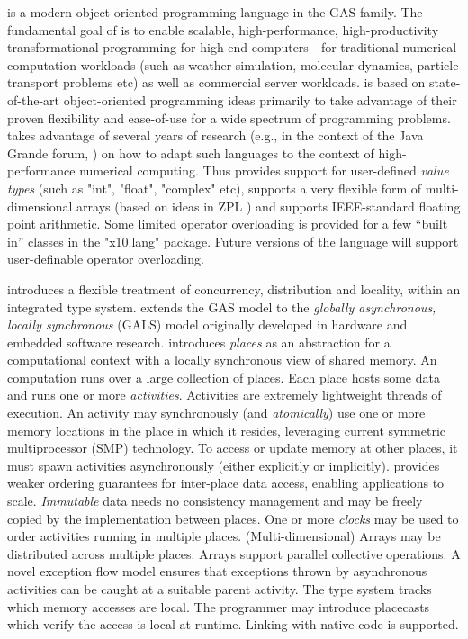 \Xten{} is a modern object-oriented programming language
in the GAS family. The fundamental goal of \Xten{} is to enable
scalable, high-performance, high-productivity transformational
programming for high-end computers---for traditional numerical
computation workloads (such as weather simulation, molecular dynamics,
particle transport problems etc) as well as commercial server
workloads.
\Xten{} is based on state-of-the-art object-oriented
programming ideas primarily to take advantage of their proven
flexibility and ease-of-use for a wide spectrum of programming
problems. \Xten{} takes advantage of several years of research (e.g.,{}
in the context of the Java Grande forum,
\cite{moreira00java,kava}) on how to adapt such languages to the context of
high-performance numerical computing. Thus \Xten{} provides support
for user-defined {\em value types} (such as \xcd"int", \xcd"float",
\xcd"complex" etc), supports a very
flexible form of multi-dimensional arrays (based on ideas in ZPL
\cite{zpl}) and supports IEEE-standard floating point arithmetic.
Some limited operator overloading is provided for a few ``built in''
classes in the \xcd"x10.lang" package.  Future versions of the
language will support user-definable operator overloading.

{}\Xten{} introduces a flexible treatment of concurrency, distribution
and locality, within an integrated type system. \Xten{} extends the
GAS model to the {\em globally asynchronous, locally synchronous}
(GALS) model originally developed in hardware and embedded software
research.  {}\Xten{} introduces {\em places} as an abstraction for a
computational context with a locally synchronous view of shared
memory. An \Xten{} computation runs over a large collection of places.
Each place hosts some data and runs one or more {\em
activities}. Activities are extremely lightweight threads of
execution. An activity may synchronously (and {\em atomically}) use
one or more memory locations in the place in which it resides,
leveraging current symmetric multiprocessor (SMP) technology.  
To access or update memory at other places, it must 
spawn activities asynchronously (either explicitly or implicitly).
\Xten{} provides weaker ordering guarantees for
inter-place data access, enabling applications to scale.  {\em
Immutable} data needs no consistency management and may be freely
copied by the implementation between places.  One or more {\em clocks}
may be used to order activities running in multiple
places. (Multi-dimensional) Arrays may be distributed across multiple
places. Arrays support parallel collective operations. A novel
exception flow model ensures that exceptions thrown by asynchronous
activities can be caught at a suitable parent activity.  The type
system tracks which memory accesses are local. The programmer may
introduce placecasts which verify the access is local at runtime.
Linking with native code is supported.

